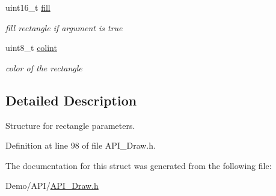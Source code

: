 \begin{DoxyCompactItemize}
\mbox{\label{struct_s_q_u_a_r_e_abd83f5d2f2e1a767233d92cba99540f5}} 
uint16\+\_\+t \hyperlink{struct_s_q_u_a_r_e_abd83f5d2f2e1a767233d92cba99540f5}{fill}
\begin{DoxyCompactList}\small\item\em fill rectangle if argument is true \end{DoxyCompactList}\item 
\mbox{\label{struct_s_q_u_a_r_e_a21caa4b27a71b7967f1a2d64f196a674}} 
uint8\+\_\+t \hyperlink{struct_s_q_u_a_r_e_a21caa4b27a71b7967f1a2d64f196a674}{colint}
\begin{DoxyCompactList}\small\item\em color of the rectangle \end{DoxyCompactList}\end{DoxyCompactItemize}


\subsection{Detailed Description}
Structure for rectangle parameters. 

Definition at line 98 of file A\+P\+I\+\_\+\+Draw.\+h.



The documentation for this struct was generated from the following file\+:\begin{DoxyCompactItemize}
\item 
Demo/\+A\+P\+I/\hyperlink{_a_p_i___draw_8h}{A\+P\+I\+\_\+\+Draw.\+h}\end{DoxyCompactItemize}
